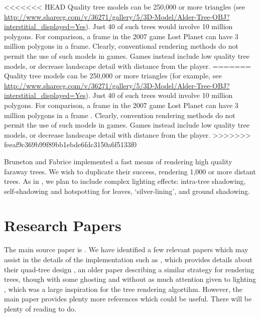 \documentclass{article}
\begin{document}
<<<<<<< HEAD
Quality tree models can be 250,000 or more triangles \cite{???}
(see \url{http://www.sharecg.com/v/36271/gallery/5/3D-Model/Alder-Tree-OBJ?interstitial_displayed=Yes}).  Just 40 of such trees would involve 10 million polygons.  For comparison, a frame in the 2007 game Lost Planet can have 3 million polygons in a frame\cite{many_polygons}.  Clearly, conventional rendering methods do not permit the use of such models in games.  Games instead include low quality tree models, or decrease landscape detail with distance from the player.
=======
Quality tree models can be 250,000 or more triangles
(for example, see \url{http://www.sharecg.com/v/36271/gallery/5/3D-Model/Alder-Tree-OBJ?interstitial_displayed=Yes}).  Just 40 of such trees would involve 10 million polygons.  For comparison, a frame in the 2007 game Lost Planet can have 3 million polygons in a frame \cite{many_polygons}.  Clearly, convention rendering methods do not permit the use of such models in games.  Games instead include low quality tree models, or decrease landscape detail with distance from the player.
>>>>>>> feeaf9c369b99f89bb1ebde6fdc3150a6f5133f0

Bruneton and Fabrice \cite{trees} implemented a fast means of rendering high quality faraway trees.  We wish to duplicate their success, rendering 1,000 or more distant trees.  As in \cite{trees}, we plan to include complex lighting effects: intra-tree shadowing, self-shadowing and hotspotting for leaves, ‘silver-lining’, and ground shadowing.

\section{Research Papers}
The main source paper is \cite{trees}. We have identified a few relevant papers which may assist in the details of the implementation such as 
\cite{vecterrain}, which provides details about their quad-tree design \cite{treeszbuf}, an older paper describing a similar strategy for rendering trees, though with some ghosting and without as much attention given to lighting \cite{fastlightfield}, which was a large inspiration for the tree rendering algortihm.  However, the main paper provides plenty more references which could be useful. There will be plenty of reading to do.
\end{document}
